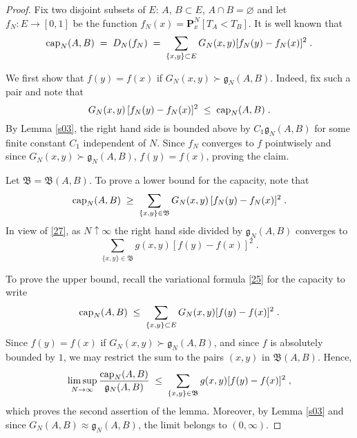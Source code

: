 \documentclass[reqno]{amsart}
\begin{document}
\begin{proof}
Fix two disjoint subsets of $E$: $A$, $B\subset E$, $A\cap
B=\varnothing$ and let $f_N : E\to [0,1]$ be the function $f_N(x) =
{{\mathbf P}}^N_x[T_A < T_B]$. It is well known that
\begin{equation*}
{{\rm cap}}_N(A,B) \;=\; D_N (f_N) \;=\;
\sum_{\{x,y\}\subset E}  G_N(x,y) [f_N (y) - f_N(x)]^2 \;. 
\end{equation*}

We first show that $f(y) = f(x)$ if $G_N(x,y) \succ {{\mathfrak g}}_N(A,B)$. Indeed, fix such a pair and note that
\begin{equation*}
G_N(x,y)\, [f_N (y) - f_N(x)]^2 \;\le\;  {{\rm cap}}_N(A,B)\;.
\end{equation*}
By Lemma \ref{s03}, the right hand side is bounded above by $C_1 {{\mathfrak g}}_N(A,B)$ for some finite constant $C_1$ independent of $N$.  Since
$f_N$ converges to $f$ pointwisely and since $G_N(x,y) \succ {{\mathfrak g}}_N(A,B)$, $f(y)=f(x)$, proving the claim.

Let ${{\mathfrak B}} = {{\mathfrak B}}(A,B)$. To prove a lower bound for the capacity,
note that
\begin{equation*}
{{\rm cap}}_N(A,B) \;\ge\;  
\sum_{\{x,y\} \in {{\mathfrak B}}} G_N(x,y) \, [f_N (y) - f_N(x)]^2 \;. 
\end{equation*}
In view of \eqref{27}, as $N\uparrow\infty$ the right hand side
divided by ${{\mathfrak g}}_N(A,B)$ converges to
\begin{equation*}
\sum_{\{x,y\}\in {{\mathfrak B}}} g(x,y) [f (y) - f(x)]^2 \;. 
\end{equation*}

To prove the upper bound, recall the variational formula \eqref{25}
for the capacity to write
\begin{equation*}
{{\rm cap}}_N(A,B) \;\le\; 
\sum_{\{x,y\}\subset E} G_N(x,y) [f (y) - f(x)]^2\;.
\end{equation*}
Since $f(y) = f(x)$ if $G_N(x,y) \succ {{\mathfrak g}}_N(A,B)$, and since $f$
is absolutely bounded by $1$, we may restrict the sum to the pairs
$(x,y)$ in ${{\mathfrak B}}(A,B)$. Hence,
\begin{equation*}
\limsup_{N\to\infty} \frac{{{\rm cap}}_N(A,B)}{{{\mathfrak g}}_N(A,B)} \;\le\; 
\sum_{\{x,y\} \in {{\mathfrak B}}} g(x,y) [f (y) - f(x)]^2\;,
\end{equation*}
which proves the second assertion of the lemma. Moreover, by Lemma
\ref{s03} and since $G_N(A,B) \approx {{\mathfrak g}}_N(A,B)$, the limit belongs
to $(0,\infty)$.
\end{proof}
\end{document}
